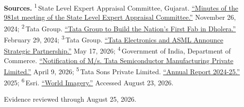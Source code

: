 \begin{minipage}[t][0.90\textheight][t]{\textwidth}
{\sffamily\scriptsize\setlength{\emergencystretch}{1.5em}\textbf{Sources.} \textsuperscript{1}\,State Level Expert Appraisal Committee, Gujarat. \href{\detokenize{https://environmentclearance.nic.in/writereaddata/FormB/agenda/0801202511837869SEACMinutesofthe982ndVC.pdf}}{\enquote{Minutes of the 981st meeting of the State Level Expert Appraisal Committee.}} November 26, 2024; \textsuperscript{2}\,Tata Group. \href{\detokenize{https://www.tata.com/newsroom/business/first-indian-fab-semiconductor-dholera}}{\enquote{Tata Group to Build the Nation's First Fab in Dholera.}} February 29, 2024; \textsuperscript{3}\,Tata Group. \href{\detokenize{https://www.tata.com/newsroom/business/tata-electronics-asml-semiconductor-ecosystem}}{\enquote{Tata Electronics and ASML Announce Strategic Partnership.}} May 17, 2026; \textsuperscript{4}\,Government of India, Department of Commerce. \href{\detokenize{https://sezindia.gov.in/node/2838}}{\enquote{Notification of M/s. Tata Semiconductor Manufacturing Private Limited.}} April 9, 2026; \textsuperscript{5}\,Tata Sons Private Limited. \href{\detokenize{https://www.tata.com/content/dam/tata/pdf/fy25/Tata-Sons-Annual-Report-FY25.pdf}}{\enquote{Annual Report 2024-25.}} 2025; \textsuperscript{6}\,Esri. \href{\detokenize{https://www.arcgis.com/home/item.html?id=10df2279f9684e4a9f6a7f08febac2a9}}{\enquote{World Imagery.}} Accessed August 23, 2026.\par}
\vfill
\noindent{\color{hairline}\rule{\linewidth}{0.4pt}}\par\smallskip
{\sffamily\scriptsize\color{black!58} Evidence reviewed through August 25, 2026.\par}
\end{minipage}
\clearpage
